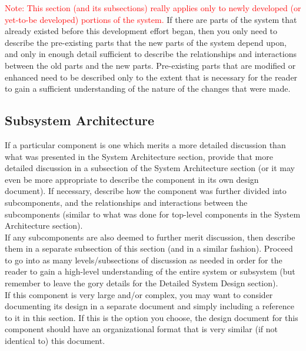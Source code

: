 \documentclass{FastFyp}
\begin{document}
\textcolor{red}{Note: This section (and its subsections) really applies only to newly developed (or yet-to-be developed) portions of the system.} If there are parts of the system that already existed before this development effort began, then you only need to describe the pre-existing parts that the new parts of the system depend upon, and only in enough detail sufficient to describe the relationships and interactions between the old parts and the new parts. Pre-existing parts that are modified or enhanced need to be described only to the extent that is necessary for the reader to gain a sufficient understanding of the nature of the changes that were made.
\subsection{Subsystem Architecture}
If a particular component is one which merits a more detailed discussion than what was presented in the System Architecture section, provide that more detailed discussion in a subsection of the System Architecture section (or it may even be more appropriate to describe the component in its own design document). If necessary, describe how the component was further divided into subcomponents, and the relationships and interactions between the subcomponents (similar to what was done for top-level components in the System Architecture section).\\
If any subcomponents are also deemed to further merit discussion, then describe them in a separate subsection of this section (and in a similar fashion). Proceed to go into as many levels/subsections of discussion as needed in order for the reader to gain a high-level understanding of the entire system or subsystem (but remember to leave the gory details for the Detailed System Design section).\\
If this component is very large and/or complex, you may want to consider documenting its design in a separate document and simply including a reference to it in this section. If this is the option you choose, the design document for this component should have an organizational format that is very similar (if not identical to) this document.
\end{document}
